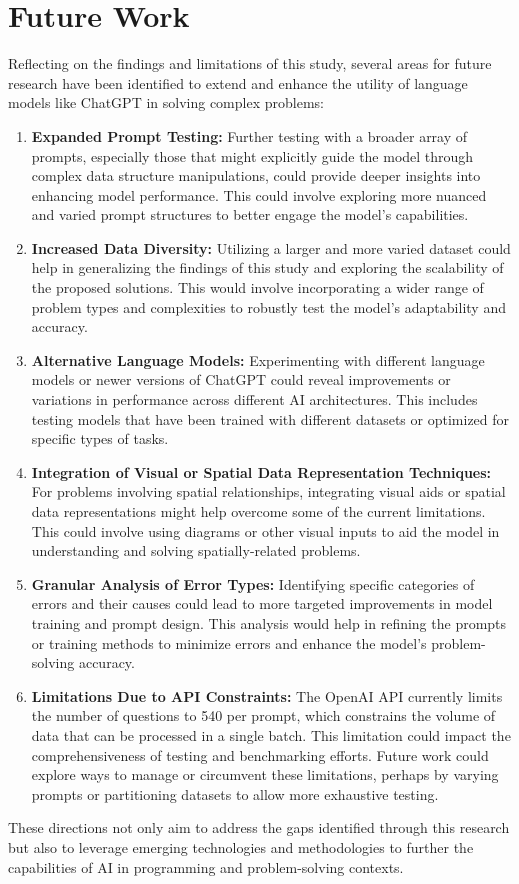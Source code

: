 \section{Future Work}
Reflecting on the findings and limitations of this study, several areas for future research have been identified to extend and enhance the utility of language models like ChatGPT in solving complex problems:

\begin{enumerate}
    \item \textbf{Expanded Prompt Testing:} Further testing with a broader array of prompts, especially those that might explicitly guide the model through complex data structure manipulations, could provide deeper insights into enhancing model performance. This could involve exploring more nuanced and varied prompt structures to better engage the model's capabilities.
    
    \item \textbf{Increased Data Diversity:} Utilizing a larger and more varied dataset could help in generalizing the findings of this study and exploring the scalability of the proposed solutions. This would involve incorporating a wider range of problem types and complexities to robustly test the model's adaptability and accuracy.
    
    \item \textbf{Alternative Language Models:} Experimenting with different language models or newer versions of ChatGPT could reveal improvements or variations in performance across different AI architectures. This includes testing models that have been trained with different datasets or optimized for specific types of tasks.
    
    \item \textbf{Integration of Visual or Spatial Data Representation Techniques:} For problems involving spatial relationships, integrating visual aids or spatial data representations might help overcome some of the current limitations. This could involve using diagrams or other visual inputs to aid the model in understanding and solving spatially-related problems.
    
    \item \textbf{Granular Analysis of Error Types:} Identifying specific categories of errors and their causes could lead to more targeted improvements in model training and prompt design. This analysis would help in refining the prompts or training methods to minimize errors and enhance the model's problem-solving accuracy.
    
    \item \textbf{Limitations Due to API Constraints:} The OpenAI API currently limits the number of questions to 540 per prompt, which constrains the volume of data that can be processed in a single batch. This limitation could impact the comprehensiveness of testing and benchmarking efforts. Future work could explore ways to manage or circumvent these limitations, perhaps by varying prompts or partitioning datasets to allow more exhaustive testing.
\end{enumerate}

These directions not only aim to address the gaps identified through this research but also to leverage emerging technologies and methodologies to further the capabilities of AI in programming and problem-solving contexts.




